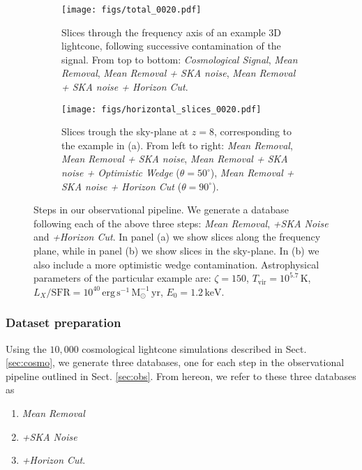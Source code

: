 \documentclass[fleqn,usenatbib]{mnras}
\begin{document}
\begin{figure*}
    \centering
    \begin{subfigure}[b]{\textwidth}
        \centering
        \texttt{[image: figs/total\_0020.pdf]}
        \caption{Slices through the frequency axis of an example 3D lightcone, following successive contamination of the signal. From top to bottom: \textit{Cosmological Signal}, \textit{Mean Removal}, \textit{Mean Removal + SKA noise}, \textit{Mean Removal + SKA noise + Horizon Cut}.}
        \vspace{0.2cm}
        \label{fig:lightcone_total_pipeline}
    \end{subfigure}
    \begin{subfigure}[b]{\textwidth}
        \centering
        \texttt{[image: figs/horizontal\_slices\_0020.pdf]}
        \caption{Slices trough the sky-plane at $z=8$, corresponding to the example in (a). From left to right: \textit{Mean Removal}, \textit{Mean Removal + SKA noise}, \textit{Mean Removal + SKA noise + Optimistic Wedge} ($\theta = 50^\circ$), \textit{Mean Removal + SKA noise + Horizon Cut} ($\theta = 90^\circ$).}
        \label{fig:lightcone_contaminated_zslice}
    \end{subfigure}
        \caption{Steps in our observational pipeline. We generate a database following each of the above three steps: \textit{Mean Removal}, \textit{+SKA Noise} and \textit{+Horizon Cut}.  In panel (a) we show slices along the frequency plane, while in panel (b) we show slices in the sky-plane.  In (b) we also include a more optimistic wedge contamination. Astrophysical parameters of the particular example are: $\zeta = 150$, $T_{\mathrm{vir}} = 10^{5.7} \, \mathrm{K}$, $L_X / \mathrm{SFR} = 10^{40} \, \mathrm{erg \, s^{-1} \, M_\odot^{-1} \, yr}$, $E_0 = 1.2 \, \mathrm{keV}$.}
        \label{fig:observation_pipeline}
\end{figure*}

\subsubsection{Dataset preparation}

Using the $10,000$ cosmological lightcone simulations described in Sect. \ref{sec:cosmo}, we generate three databases, one for each step in the observational pipeline outlined in Sect. \ref{sec:obs}.  From hereon, we refer to these three databases as
\begin{enumerate}
\item \textit{Mean Removal}
\item \textit{+SKA Noise}
\item \textit{+Horizon Cut}.
\end{enumerate}
\end{document}
